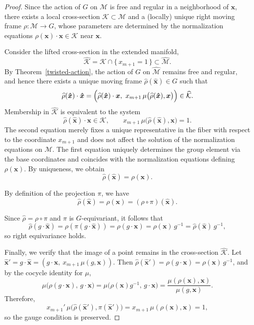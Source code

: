 \documentclass[12pt,reqno]{amsart}
\begin{document}
\begin{proof}
Since the action of $G$ on $\mathcal M$ is free and regular in a neighborhood of $\boldsymbol x$, there exists
a local cross-section $\mathcal K \subset \mathcal M$ and a (locally) unique right moving frame
$\rho : \mathcal M \to G$, whose parameters are determined by the normalization equations
$\rho(\boldsymbol x) \cdot \boldsymbol x \in \mathcal K$ near $\boldsymbol x$.

Consider the lifted cross-section in the extended manifold,
\[
\widehat{\mathcal K} = \mathcal K \cap \{\, x_{m+1} = 1 \,\} \subset \widehat{\mathcal M}.
\]
By Theorem~\ref{twisted-action}, the action of $G$ on $\widehat{\mathcal M}$ remains free and regular,
and hence there exists a unique moving frame $\widehat{\rho}(\boldsymbol{\hat x}) \in G$ such that
\[
\widehat{\rho}(\boldsymbol{\hat x}) \cdot \boldsymbol{\hat x}
=
\Bigl(\widehat{\rho}(\boldsymbol{\hat x}) \cdot \boldsymbol x,\ 
x_{m+1}\,\mu\bigl(\widehat{\rho}(\boldsymbol{\hat x}), \boldsymbol x\bigr)\Bigr)
\in \widehat{\mathcal K}.
\]
Membership in $\widehat{\mathcal K}$ is equivalent to the system
\[
\widehat{\rho}(\boldsymbol{\hat x}) \cdot \boldsymbol x \in \mathcal K,
\qquad
x_{m+1}\,\mu\bigl(\widehat{\rho}(\boldsymbol{\hat x}), \boldsymbol x\bigr)=1.
\]
The second equation merely fixes a unique representative in the fiber with respect to the coordinate
$x_{m+1}$ and does not affect the solution of the normalization equations on $\mathcal M$.
The first equation uniquely determines the group element via the base coordinates and coincides
with the normalization equations defining $\rho(\boldsymbol x)$. By uniqueness, we obtain
\[
\widehat{\rho}(\boldsymbol{\hat x}) = \rho(\boldsymbol x).
\]

By definition of the projection $\pi$, we have
\[
\widehat{\rho}(\boldsymbol{\hat x}) = \rho(\boldsymbol x) = (\rho \circ \pi)(\boldsymbol{\hat x}).
\]

Since $\widehat{\rho} = \rho \circ \pi$ and $\pi$ is $G$-equivariant, it follows that
\[
\widehat{\rho}(g \cdot \boldsymbol{\hat x})
= \rho(\pi(g \cdot \boldsymbol{\hat x}))
= \rho(g \cdot \boldsymbol x)
= \rho(\boldsymbol x)\,g^{-1}
= \widehat{\rho}(\boldsymbol{\hat x})\,g^{-1},
\]
so right equivariance holds.

Finally, we verify that the image of a point remains in the cross-section $\widehat{\mathcal K}$.
Let $\boldsymbol{\hat x}' = g \cdot \boldsymbol{\hat x}
= (g \cdot \boldsymbol x,\ x_{m+1}\,\mu(g,\boldsymbol x))$.
Then $\widehat{\rho}(\boldsymbol{\hat x}') = \rho(g \cdot \boldsymbol x) = \rho(\boldsymbol x)\,g^{-1}$,
and by the cocycle identity for $\mu$,
\[
\mu\bigl(\rho(g \cdot \boldsymbol x),\,g \cdot \boldsymbol x\bigr)
=
\mu\bigl(\rho(\boldsymbol x)g^{-1},\,g \cdot \boldsymbol x\bigr)
=
\frac{\mu(\rho(\boldsymbol x),\boldsymbol x)}{\mu(g,\boldsymbol x)}.
\]
Therefore,
\[
x_{m+1}'\,\mu\bigl(\widehat{\rho}(\boldsymbol{\hat x}'),\pi(\boldsymbol{\hat x}')\bigr)
=
x_{m+1}\,\mu(\rho(\boldsymbol x),\boldsymbol x)
=1,
\]
so the gauge condition is preserved.
\end{proof}
\end{document}

